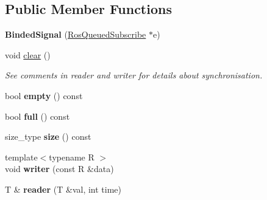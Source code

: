 \subsection*{Public Member Functions}
\begin{DoxyCompactItemize}
\item 
\mbox{\label{structdynamic__graph_1_1internal_1_1BindedSignal_ae6c7caaafe3050957700695604ec9c08}} 
{\bfseries Binded\+Signal} (\hyperlink{classdynamic__graph_1_1RosQueuedSubscribe}{Ros\+Queued\+Subscribe} $\ast$e)
\item 
\mbox{\label{structdynamic__graph_1_1internal_1_1BindedSignal_a8d377e90b7ece8b1861ddcfa8c7617c8}} 
void \hyperlink{structdynamic__graph_1_1internal_1_1BindedSignal_a8d377e90b7ece8b1861ddcfa8c7617c8}{clear} ()
\begin{DoxyCompactList}\small\item\em See comments in reader and writer for details about synchronisation. \end{DoxyCompactList}\item 
\mbox{\label{structdynamic__graph_1_1internal_1_1BindedSignal_a18115bf56492b872477579e22030a67f}} 
bool {\bfseries empty} () const
\item 
\mbox{\label{structdynamic__graph_1_1internal_1_1BindedSignal_a6ab40610a2032e71d51c309eaf111953}} 
bool {\bfseries full} () const
\item 
\mbox{\label{structdynamic__graph_1_1internal_1_1BindedSignal_a4a0a6353db02fa672d0acb37d8cddf9f}} 
size\+\_\+type {\bfseries size} () const
\item 
\mbox{\label{structdynamic__graph_1_1internal_1_1BindedSignal_a31010b861170ae56f87a4457b171a1b9}} 
{\footnotesize template$<$typename R $>$ }\\void {\bfseries writer} (const R \&data)
\item 
\mbox{\label{structdynamic__graph_1_1internal_1_1BindedSignal_a292e656913781f59d244df6cfea7ccb0}} 
T \& {\bfseries reader} (T \&val, int time)
\end{DoxyCompactItemize}
